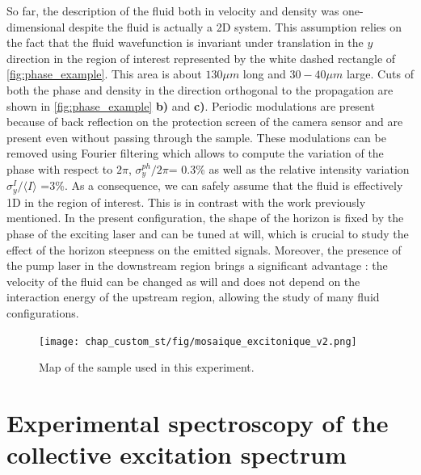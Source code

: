 So far, the description of the fluid both in velocity and density was one-dimensional despite the fluid is actually a 2D system. This assumption
relies on the fact that the fluid wavefunction is invariant under translation in the $y$ direction in the  region of interest represented by the white dashed rectangle of \autoref{fig:phase_example}. This area is about $130 \mu m$ long and $30-40 \mu m $ large. 
Cuts of both the phase and density in the direction orthogonal to the propagation are shown in \autoref{fig:phase_example} \textbf{b)} and \textbf{c)}. Periodic modulations are present because of back reflection on the protection screen of the camera sensor and are present even without passing through the sample. These modulations can be removed
using Fourier filtering which allows to compute the variation of the phase with respect to $2\pi$,  $\sigma_y^{ph}/2\pi$= 0.3\% as well as the relative intensity variation $\sigma_y^I/\langle I \rangle$ =3\%. As a consequence,
we can safely assume that the fluid is effectively 1D in the region of interest. This is in contrast with the work \cite{nguyen_acoustic_2015} previously mentioned. In the present configuration, the shape of the horizon is fixed by the phase of the exciting laser and can be tuned at will, which is crucial to
study the effect of the horizon steepness on the emitted signals. Moreover, the presence of the pump laser in the downstream region brings a significant advantage : the velocity of the fluid can be changed as will and does not depend on the interaction energy of the upstream region, allowing the study of many fluid configurations.
\label{sub:high_resolution_spectroscopy}

\begin{figure}[p]
    \centering
    \texttt{[image: chap\_custom\_st/fig/mosaique\_excitonique\_v2.png]}
    \caption{Map of the sample used in this experiment.}
    \label{fig:sample_map}
\end{figure}


\section{Experimental spectroscopy of the collective excitation spectrum}

